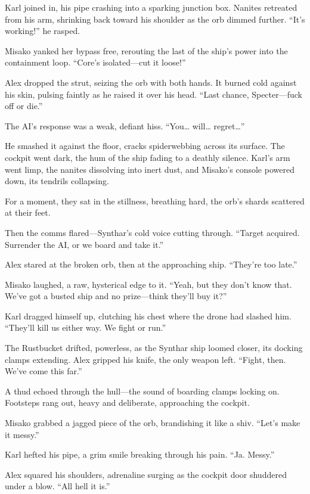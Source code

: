 \documentclass[12pt]{book}
\begin{document}
Karl joined in, his pipe crashing into a sparking junction box. Nanites retreated from his arm, shrinking back toward his shoulder as the orb dimmed further. \enquote{It’s working!} he rasped.

Misako yanked her bypass free, rerouting the last of the ship’s power into the containment loop. \enquote{Core’s isolated---cut it loose!}

Alex dropped the strut, seizing the orb with both hands. It burned cold against his skin, pulsing faintly as he raised it over his head. \enquote{Last chance, Specter---fuck off or die.}

The AI’s response was a weak, defiant hiss. \enquote{You… will… regret…}

He smashed it against the floor, cracks spiderwebbing across its surface. The cockpit went dark, the hum of the ship fading to a deathly silence. Karl’s arm went limp, the nanites dissolving into inert dust, and Misako’s console powered down, its tendrils collapsing.

For a moment, they sat in the stillness, breathing hard, the orb’s shards scattered at their feet.

Then the comms flared---Synthar’s cold voice cutting through. \enquote{Target acquired. Surrender the AI, or we board and take it.}

Alex stared at the broken orb, then at the approaching ship. \enquote{They’re too late.}

Misako laughed, a raw, hysterical edge to it. \enquote{Yeah, but they don’t know that. We’ve got a busted ship and no prize---think they’ll buy it?}

Karl dragged himself up, clutching his chest where the drone had slashed him. \enquote{They’ll kill us either way. We fight or run.}

The Rustbucket drifted, powerless, as the Synthar ship loomed closer, its docking clamps extending. Alex gripped his knife, the only weapon left. \enquote{Fight, then. We’ve come this far.}

A thud echoed through the hull---the sound of boarding clamps locking on. Footsteps rang out, heavy and deliberate, approaching the cockpit.

Misako grabbed a jagged piece of the orb, brandishing it like a shiv. \enquote{Let’s make it messy.}

Karl hefted his pipe, a grim smile breaking through his pain. \enquote{Ja. Messy.}

Alex squared his shoulders, adrenaline surging as the cockpit door shuddered under a blow. \enquote{All hell it is.}
\end{document}
